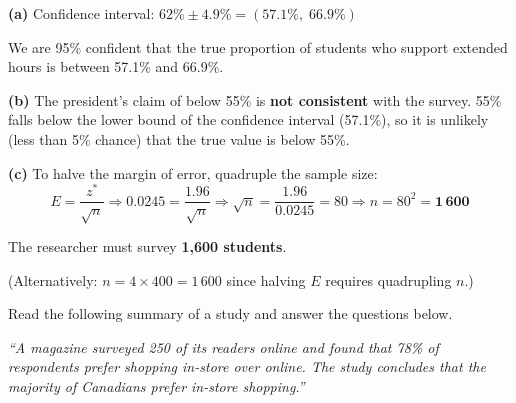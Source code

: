 \documentclass[addpoints]{exam}
\begin{document}
\begin{questions}
\begin{solution}[10cm]
\textbf{(a)} Confidence interval: $62\% \pm 4.9\% = (57.1\%,\; 66.9\%)$

We are 95\% confident that the true proportion of students who support extended hours is between
57.1\% and 66.9\%.

\textbf{(b)} The president's claim of below 55\% is \textbf{not consistent} with the survey. 55\% falls
below the lower bound of the confidence interval (57.1\%), so it is unlikely (less than 5\% chance)
that the true value is below 55\%.

\textbf{(c)} To halve the margin of error, quadruple the sample size:
\[E = \frac{z^*}{\sqrt{n}} \Rightarrow 0.0245 = \frac{1.96}{\sqrt{n}} \Rightarrow \sqrt{n} = \frac{1.96}{0.0245} = 80 \Rightarrow n = 80^2 = \mathbf{1\,600}\]

The researcher must survey \textbf{1,600 students}.

(Alternatively: $n = 4 \times 400 = 1\,600$ since halving $E$ requires quadrupling $n$.)
\end{solution}

\question[8] Read the following summary of a study and answer the questions below.

\textit{``A magazine surveyed 250 of its readers online and found that 78\% of respondents prefer
shopping in-store over online. The study concludes that the majority of Canadians prefer
in-store shopping.''}
\end{questions}
\end{document}
